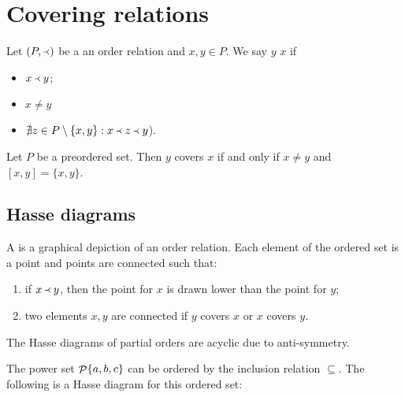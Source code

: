\section{Covering relations}
\begin{definition}
Let $(P,\Yleft)$ be a an order relation and $x,y\in P$. We say $y$  $x$ if
\begin{itemize}
\item $x\Yleft y$;
\item $x\neq y$
\item $\nexists z\in P\setminus\{x,y\}: x\Yleft z \Yleft y$).
\end{itemize}
\end{definition}

\begin{lemma}
Let $P$ be a preordered set. Then $y$ covers $x$ \textup{if and only if} $x\neq y$ and $[x,y] = \{x,y\}$.
\end{lemma}

\subsection{Hasse diagrams}
A  is a graphical depiction of an order relation. Each element of the ordered set is a point and points are connected such that:
\begin{enumerate}
\item if $x \Yleft y$, then the point for $x$ is drawn lower than the point for $y$;
\item two elements $x,y$ are connected if $y$ covers $x$ or $x$ covers $y$.
\end{enumerate}

\begin{lemma}
The Hasse diagrams of partial orders are acyclic due to anti-symmetry.
\end{lemma}

\begin{example}
The power set $\mathop{\mathcal{P}}\{a,b,c\}$ can be ordered by the inclusion relation $\subseteq$. The following is a Hasse diagram for this ordered set:
\begin{center}
\end{center}
\end{example}


